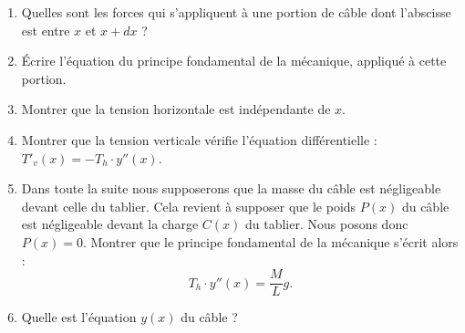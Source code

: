 \begin{frame}
\begin{exercicecours}
\begin{enumerate}

 \item Quelles sont les forces qui s'appliquent à une portion de câble dont l'abscisse est entre
 $x$ et $x+dx$ ?


 \item \'Ecrire l'équation du principe fondamental de la mécanique, appliqué à cette portion.


 \item Montrer que la tension horizontale est indépendante de $x$.


 \item Montrer que la tension verticale vérifie l'équation différentielle :
$T'_v(x)=-T_h \cdot y''(x)$.


 \item Dans toute la suite nous supposerons que la masse du câble est négligeable devant
celle du tablier. Cela revient à supposer que le poids $P(x)$ du câble est négligeable devant
la charge $C(x)$ du tablier. Nous posons donc $P(x)=0$.
Montrer que le principe fondamental de la mécanique s'écrit alors :
\vspace*{-2ex}
$$T_h \cdot y''(x) = \frac{M}{L} g.$$
\vspace*{-4ex}

 \item Quelle est l'équation $y(x)$ du câble ?

\end{enumerate}

\end{exercicecours}
\end{frame}


